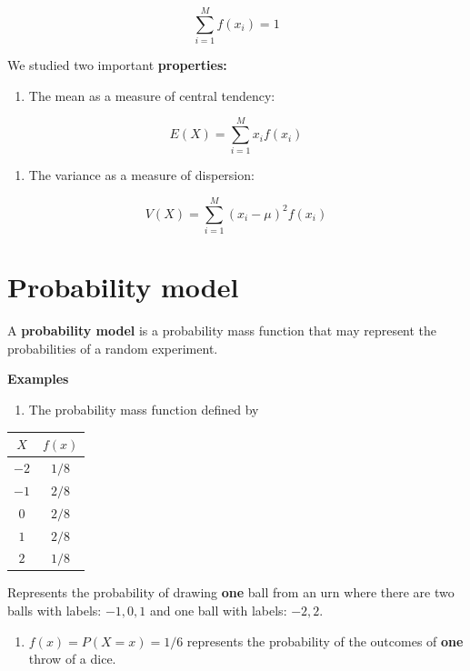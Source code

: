 \documentclass[
]{book}
\providecommand{\tightlist}{%
  \setlength{\itemsep}{0pt}\setlength{\parskip}{0pt}}
\begin{document}
\[\sum_{i=1}^M f(x_i)=1\]

We studied two important \textbf{properties:}

\begin{enumerate}
\def\labelenumi{\arabic{enumi})}
\tightlist
\item
  The mean as a measure of central tendency:
\end{enumerate}

\[E(X)= \sum_{i=1}^M x_i f(x_i)\]

\begin{enumerate}
\def\labelenumi{\arabic{enumi})}
\setcounter{enumi}{1}
\tightlist
\item
  The variance as a measure of dispersion:
\end{enumerate}

\[V(X)= \sum_{i=1}^M (x_i-\mu)^2 f(x_i)\]

\hypertarget{probability-model}{%
\section{Probability model}\label{probability-model}}

A \textbf{probability model} is a probability mass function that may represent the probabilities of a random experiment.

\textbf{Examples}

\begin{enumerate}
\def\labelenumi{\arabic{enumi})}
\tightlist
\item
  The probability mass function defined by
\end{enumerate}

\begin{longtable}[]{@{}cc@{}}
\toprule\noalign{}
\(X\) & \(f(x)\) \\
\midrule\noalign{}
\endhead
\bottomrule\noalign{}
\endlastfoot
\(-2\) & \(1/8\) \\
\(-1\) & \(2/8\) \\
\(0\) & \(2/8\) \\
\(1\) & \(2/8\) \\
\(2\) & \(1/8\) \\
\end{longtable}

Represents the probability of drawing \textbf{one} ball from an urn where there are two balls with labels: \(-1, 0, 1\) and one ball with labels: \(-2, 2\).

\begin{enumerate}
\def\labelenumi{\arabic{enumi})}
\setcounter{enumi}{1}
\tightlist
\item
  \(f(x)=P(X=x)=1/6\) represents the probability of the outcomes of \textbf{one} throw of a dice.
\end{enumerate}
\end{document}
